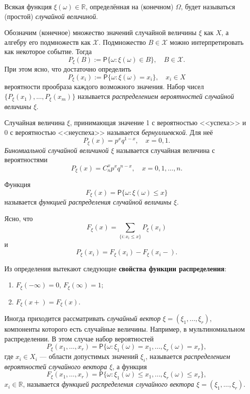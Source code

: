 \begin{definition}
Всякая функция $ \xi(\omega) \in \mathbb R $, определённая на (конечном) $ \Omega $, будет
называться (простой) \emph{случайной величиной}.
\end{definition}

Обозначим (конечное) множество значений случайной величины $ \xi $ как $ X $, а
алгебру его подмножеств как $ \mathscr X $. Подмножество $ B \in \mathscr X $
можно интерпретировать как некоторое событие. Тогда	 
\[
	P_\xi (B) := \mathsf P\{\omega \colon \xi(\omega) \in B\}, \quad B \in \mathscr
	X. 
\]
\sloppy При этом ясно, что достаточно определить 
\[
	P_\xi(x_i) := \mathsf P \{\omega \colon \xi(\omega) = x_i\}, \quad x_i \in X
\]
вероятности прообраза каждого возможного значения.
Набор чисел $ \{ P_\xi(x_1), \ldots, P_\xi(x_m)\} $ называется
\emph{распределением вероятностей случайной величины $ \xi $}.

\begin{example}
	Случайная величина $ \xi $, принимающая значение 1 с вероятностью <<успеха>> и
	0 с вероятностью <<неуспеха>> называется \emph{бернуллиевской}. Для неё 
	\[
		P_\xi(x) = p^xq^{1-x}, \quad x=0,1.
	\]
	\emph{Биномиальной случайной величиной $ \xi $} называется случайная величина с вероятностями 
	\[
		P_\xi(x) = C^x_np^xq^{n-x}, \quad x = 0, 1, \ldots, n.
	\]
\end{example}

\begin{definition}
	Функция  
	\[
		F_\xi(x)=\mathsf P\{\omega\colon\xi(\omega)\leqslant x\}
	\]
	называется \emph{функцией распределения случайной величины $ \xi $}.
\end{definition}

Ясно, что 
\[
	F_\xi(x) = \sum_{\{i\colon x_i \leqslant x\}} P_\xi(x_i)
\]
и 
\[
		P_\xi(x_i) = F_\xi(x_i) - F_\xi(x_i-).
\]

Из определения вытекают следующие \textbf{свойства функции распределения}:
\begin{enumerate}
	\item $ F_\xi(-\infty) = 0 $, $ F_\xi(\infty) = 1 $;
	\item $ F_\xi(x+)=F_\xi(x) $.
\end{enumerate}

Иногда приходится рассматривать \emph{случайный вектор} $ \xi = (\xi_1, \ldots,
\xi_r)$, компоненты которого есть случайные величины. Например, в
мультиномиальном распределении. В этом случае набор вероятностей 
\[
		P_\xi(x_1, \ldots, x_r) = \mathsf P\{\omega\colon \xi_1(\omega) = x_1,
		\ldots, \xi_r(\omega)=x_r\},
\]
где $ x_i \in X_i $ --- области допустимых значений $ \xi_i $, называется
\emph{распределением вероятностей случайного вектора $ \xi $}, а функция 
\[
		F_\xi(x_1, \ldots, x_r) = \mathsf P\{\omega\colon \xi_1(\omega)\leqslant
		x_1, \ldots, \xi_r(\omega) \leqslant x_r\},
\]
$ x_i \in \mathbb R $, называется \emph{функцией распределения случайного
вектора $ \xi = (\xi_1, \ldots, \xi_r) $}.

